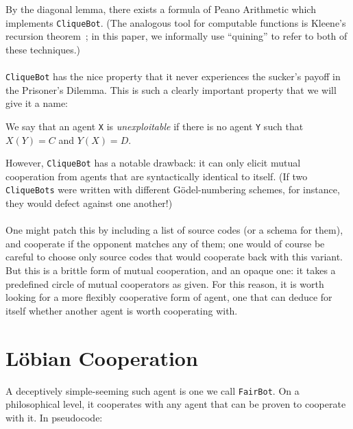 \documentclass[12pt, letterpaper]{article}
\numberwithin{equation}{section}
\newenvironment{definition}[1][Definition]{\begin{trivlist}
\item[\hskip \labelsep {\bfseries #1}]}{\end{trivlist}}
\begin{document}
By the diagonal lemma, there exists a formula of Peano Arithmetic which implements \texttt{CliqueBot}. (The analogous tool for computable functions is Kleene's recursion theorem~\cite{Kleene}; in this paper, we informally use ``quining'' to refer to both of these techniques.)\\
\\
\texttt{CliqueBot} has the nice property that it never experiences the sucker's payoff in the Prisoner's Dilemma. This is such a clearly important property that we will give it a name:
\begin{definition}
We say that an agent \texttt{X} is \emph{unexploitable} if there is no agent \texttt{Y} such that $X(Y)=C$ and $Y(X)=D$.
\end{definition}
However, \texttt{CliqueBot} has a notable drawback: it can only elicit mutual cooperation from agents that are syntactically identical to itself. (If two \texttt{CliqueBots} were written with different G\"{o}del-numbering schemes, for instance, they would defect against one another!)
\\
\\ One might patch this by including a list of source codes (or a schema for them), and cooperate if the opponent matches any of them; one would of course be careful to choose only source codes that would cooperate back with this variant. But this is a brittle form of mutual cooperation, and an opaque one: it takes a predefined circle of mutual cooperators as given. For this reason, it is worth looking for a more flexibly cooperative form of agent, one that can deduce for itself whether another agent is worth cooperating with.

\section{L\"{o}bian Cooperation}
\label{playfair}
A deceptively simple-seeming such agent is one we call \texttt{FairBot}. On a philosophical level, it cooperates with any agent that can be proven to cooperate with it. In pseudocode:

\begin{algorithm}[H]
\label{FairBot}


 \caption{\texttt{FairBot (FB)}}
\end{algorithm}
\end{document}
